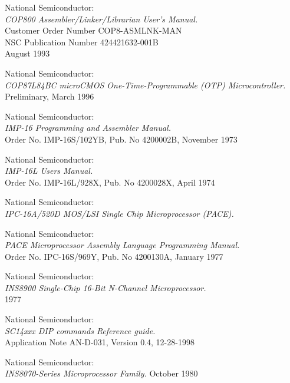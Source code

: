  National Semiconductor: \\
                 {\em COP800 Assembler/Linker/Librarian User's
                 Manual.\/} \\
                 Customer Order Number COP8-ASMLNK-MAN \\
                 NSC Publication Number 424421632-001B \\
                 August 1993

 National Semiconductor: \\
                   {\em COP87L84BC microCMOS One-Time-Programmable (OTP)
                    Microcontroller.\/} \\
                   Preliminary, March 1996

 National Semiconductor: \\
                   {\em IMP-16 Programming and Assembler Manual.\/} \\
                   Order No. IMP-16S/102YB, Pub. No 4200002B, November 1973

 National Semiconductor: \\
                   {\em IMP-16L Users Manual.\/} \\
                   Order No. IMP-16L/928X, Pub. No 4200028X, April 1974

 National Semiconductor: \\
                 {\em IPC-16A/520D MOS/LSI Single Chip Microprocessor (PACE).\/}

 National Semiconductor: \\
                  {\em PACE Microprocessor Assembly Language Programming Manual.\/} \\
                  Order No. IPC-16S/969Y, Pub. No 4200130A, January 1977

 National Semiconductor: \\
                   {\em INS8900 Single-Chip 16-Bit N-Channel Microprocessor.\/} \\
                   1977

 National Semiconductor: \\
                   {\em SC14xxx DIP commands Reference guide.} \\
                   Application Note AN-D-031, Version 0.4, 12-28-1998

 National Semiconductor: \\ 
                  {\em INS8070-Series Microprocessor Family.\/} 
                  October 1980 

